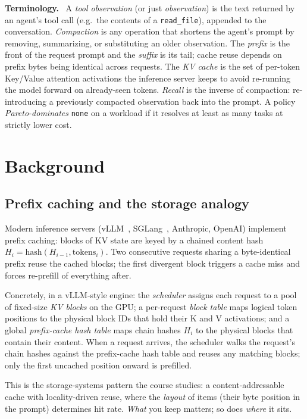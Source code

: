 \documentclass[letterpaper,twocolumn,10pt]{article}
\newcommand{\para}[1]{\smallskip\noindent\textbf{#1.}\ }
\begin{document}
\para{Terminology} A \emph{tool observation} (or just
\emph{observation}) is the text returned by an agent's tool call
(e.g.\ the contents of a \texttt{read\_file}), appended to the
conversation. \emph{Compaction} is any operation that shortens
the agent's prompt by removing, summarizing, or substituting an
older observation. The \emph{prefix} is the front of the request
prompt and the \emph{suffix} is its tail; cache reuse depends on
prefix bytes being identical across requests. The \emph{KV cache}
is the set of per-token Key/Value attention activations the
inference server keeps to avoid re-running the model forward on
already-seen tokens. \emph{Recall} is the inverse of compaction:
re-introducing a previously compacted observation back into the
prompt. A policy \emph{Pareto-dominates} \texttt{none} on a
workload if it resolves at least as many tasks at strictly lower
cost.

\section{Background}
\label{sec:background}

\subsection{Prefix caching and the storage analogy}

Modern inference servers (vLLM~\cite{kwon2023pagedattention},
SGLang~\cite{zheng2024sglang}, Anthropic, OpenAI) implement prefix
caching: blocks of KV state are keyed by a chained content hash
$H_i = \mathrm{hash}(H_{i-1}, \mathrm{tokens}_i)$. Two consecutive
requests sharing a byte-identical prefix reuse the cached blocks; the
first divergent block triggers a cache miss and forces re-prefill of
everything after.

Concretely, in a vLLM-style engine: the \emph{scheduler} assigns
each request to a pool of fixed-size \emph{KV blocks} on the GPU;
a per-request \emph{block table} maps logical token positions to
the physical block IDs that hold their K and V activations; and
a global \emph{prefix-cache hash table} maps chain hashes $H_i$
to the physical blocks that contain their content. When a
request arrives, the scheduler walks the request's chain hashes
against the prefix-cache hash table and reuses any matching
blocks; only the first uncached position onward is prefilled.

This is the storage-systems pattern the course studies: a
content-addressable cache with locality-driven reuse, where the
\emph{layout} of items (their byte position in the prompt)
determines hit rate. \emph{What} you keep matters; so does
\emph{where} it sits.
\end{document}
